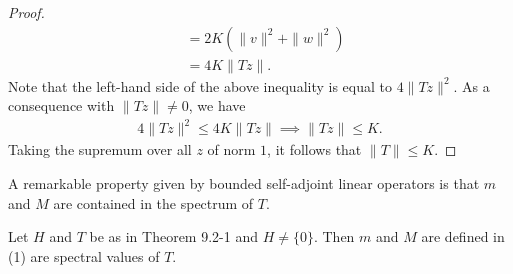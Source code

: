 \begin{proof}
\begin{align*}
                                                                                  &= 2K (\|v\|^{2} + \|w\|^{2}) \\
                                                                                  &= 4K \|Tz\|.
\end{align*}
Note that the left-hand side of the above inequality is equal to \( 4 \|Tz\|^{2} \). As a consequence with \( \|Tz \| \neq 0  \), we have 
\begin{align*}  4 \|Tz\|^{2} \leq 4K \|Tz\| \implies \|Tz\| \leq K.
\end{align*}
Taking the supremum over all \( z  \) of norm \( 1  \), it follows that \( \|T\| \leq K   \).
\end{proof}

A remarkable property given by bounded self-adjoint linear operators is that \( m  \) and \( M  \) are contained in the spectrum of \( T  \). 

\begin{theorem}\label{9.2-3}
    Let \( H  \) and \( T  \) be as in Theorem 9.2-1 and \( H \neq \{ 0  \}  \). Then \( m  \) and \( M  \) are defined in (1) are spectral values of \( T  \).
\end{theorem}


